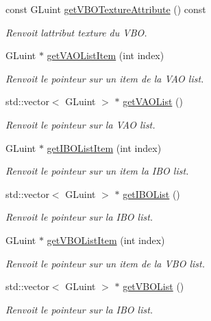 \begin{DoxyCompactItemize}
const G\+Luint \hyperlink{classglimac_1_1CubeList_a5f22e728a943a43cad45323054e5bca0}{get\+V\+B\+O\+Texture\+Attribute} () const
\begin{DoxyCompactList}\small\item\em Renvoit l\textquotesingle{}attribut texture du V\+BO. \end{DoxyCompactList}\item 
G\+Luint $\ast$ \hyperlink{classglimac_1_1CubeList_a46cfba24380b3421086a0ac97ae4e789}{get\+V\+A\+O\+List\+Item} (int index)
\begin{DoxyCompactList}\small\item\em Renvoit le pointeur sur un item de la V\+AO list. \end{DoxyCompactList}\item 
std\+::vector$<$ G\+Luint $>$ $\ast$ \hyperlink{classglimac_1_1CubeList_aeb6239962da1abae9cfc0e773b71c485}{get\+V\+A\+O\+List} ()
\begin{DoxyCompactList}\small\item\em Renvoit le pointeur sur la V\+AO list. \end{DoxyCompactList}\item 
G\+Luint $\ast$ \hyperlink{classglimac_1_1CubeList_a1b1b153b8b2171e65e9c040cfa424892}{get\+I\+B\+O\+List\+Item} (int index)
\begin{DoxyCompactList}\small\item\em Renvoit le pointeur sur un item la I\+BO list. \end{DoxyCompactList}\item 
std\+::vector$<$ G\+Luint $>$ $\ast$ \hyperlink{classglimac_1_1CubeList_acd588ce7b0feb5f2fc72d6579887e47e}{get\+I\+B\+O\+List} ()
\begin{DoxyCompactList}\small\item\em Renvoit le pointeur sur la I\+BO list. \end{DoxyCompactList}\item 
G\+Luint $\ast$ \hyperlink{classglimac_1_1CubeList_a33f8d08aac4744c18d18969b0b16517c}{get\+V\+B\+O\+List\+Item} (int index)
\begin{DoxyCompactList}\small\item\em Renvoit le pointeur sur un item de la V\+BO list. \end{DoxyCompactList}\item 
std\+::vector$<$ G\+Luint $>$ $\ast$ \hyperlink{classglimac_1_1CubeList_a82eae5adc714b8f00a23e7ad8d2aee85}{get\+V\+B\+O\+List} ()
\begin{DoxyCompactList}\small\item\em Renvoit le pointeur sur la I\+BO list. \end{DoxyCompactList}\item 

\end{DoxyCompactItemize}
